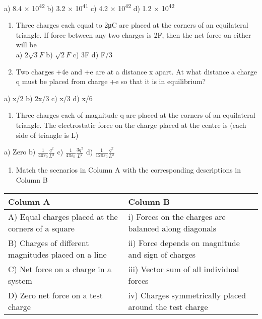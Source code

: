 a) 8.4 × 10\textsuperscript{42} b) 3.2 × 10\textsuperscript{41} c) 4.2 ×
10\textsuperscript{42} d) 1.2 × 10\textsuperscript{42}

\begin{enumerate}
\def\labelenumi{\arabic{enumi}.}
\setcounter{enumi}{13}
\item
  Three charges each equal to 2μC are placed at the corners of an
  equilateral triangle. If force between any two charges is 2F, then the
  net force on either will be\\
  a) \(2\sqrt{3}F\) b) \(\sqrt{2}F\) c) 3F d) F/3
\item
  Two charges +4e and +e are at a distance x apart. At what distance a
  charge q must be placed from charge +e so that it is in equilibrium?
\end{enumerate}

a) x/2 b) 2x/3 c) x/3 d) x/6

\begin{enumerate}
\def\labelenumi{\arabic{enumi}.}
\setcounter{enumi}{15}
\item
  Three charges each of magnitude q are placed at the corners of an
  equilateral triangle. The electrostatic force on the charge placed at
  the centre is (each side of triangle is L)
\end{enumerate}

a) Zero b) \(\frac{1}{4\pi\varepsilon_{0}}\frac{q^{2}}{L^{2}}\) c)
\(\frac{1}{4\pi\varepsilon_{0}}\frac{3q^{2}}{L^{2}}\) d)
\(\frac{1}{12\pi\varepsilon_{0}}\frac{q^{2}}{L^{2}}\)

\begin{enumerate}
\def\labelenumi{\arabic{enumi}.}
\setcounter{enumi}{16}
\item
  Match the scenarios in Column A with the corresponding descriptions in
  Column B
\end{enumerate}

\begin{longtable}[]{@{}
  >{\raggedright\arraybackslash}p{}
  >{\raggedright\arraybackslash}p{}@{}}
\toprule\noalign{}
\begin{minipage}[b]{\linewidth}\centering
\textbf{Column A}
\end{minipage} & \begin{minipage}[b]{\linewidth}\centering
\textbf{Column B}
\end{minipage} \\
\midrule\noalign{}
\endhead
\bottomrule\noalign{}
\endlastfoot
A) Equal charges placed at the corners of a square & i) Forces on the
charges are balanced along diagonals \\
B) Charges of different magnitudes placed on a line & ii) Force depends
on magnitude and sign of charges \\
C) Net force on a charge in a system & iii) Vector sum of all individual
forces \\
D) Zero net force on a test charge & iv) Charges symmetrically placed
around the test charge \\
\end{longtable}

